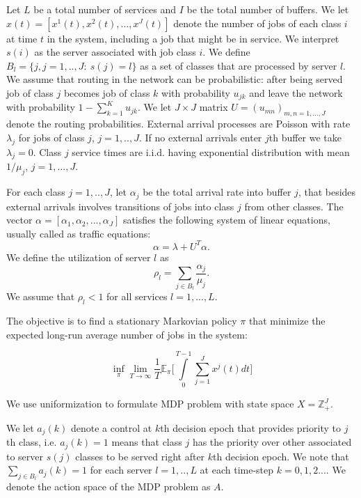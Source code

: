 \documentclass[11pt]{article}
\newcommand{\E}{\mathbb{E}}
\theoremstyle{definition}
\numberwithin{equation}{section}
\begin{document}
Let $L$ be a total number of services and $I$ be the total number of buffers.  We let $x(t) = [x^1(t), x^2(t), ..., x^J(t)]$ denote the number of jobs of each class $i$ at time $t$ in the system, including a job that might be in service. We interpret $s(i)$ as the server associated with job class $i$. We define $B_l = \{j, j=1, .., J:~ s(j)  = l\}$ as a set of classes that are processed by server $l$. We assume that routing in the network can be probabilistic: after being served  job of class $j$ becomes job of  class $k$ with probability $u_{jk}$ and leave the network with probability $1 - \sum\limits_{k=1}^K u_{jk}.$ We let $J\times J$ matrix $U = (u_{mn})_{m,n=1,..., J}$ denote the routing probabilities. External arrival processes are Poisson with rate $\lambda_j$ for jobs of class $j$, $j=1, .., J$. If no  external arrivals enter $j$th buffer we take $\lambda_j=0$. Class $j$ service times are i.i.d. having exponential
distribution with mean $1/\mu_j$, $j=1, ..., J$.


For each class $j = 1, .., J$, let $\alpha_j$ be the total arrival rate
into buffer $j$, that besides external arrivals involves transitions of jobs into class $j$ from
other classes. The vector $\alpha = [\alpha_1, \alpha_2, ..., \alpha_J]$ satisfies the following system of linear
equations, usually called as traffic equations: \begin{equation}\alpha = \lambda +U^T\alpha.\end{equation} We define the utilization of server $l$ as \begin{equation}\rho_l = \sum\limits_{j\in B_l} \frac{\alpha_j}{\mu_j}.\end{equation}
We assume that $\rho_l<1$ for all  services $l = 1, ..., L$.

 The objective is to find a stationary Markovian policy  $\pi$ that   minimize the expected long-run average number of jobs in the system:

\begin{equation}
 \inf\limits_\pi \lim\limits_{T\rightarrow \infty} \frac{1}{T} \E_{\pi}\Big[\int\limits_{0}^{T-1}\sum\limits_{j=1}^J x^j(t)dt\Big]
\end{equation}


We use uniformization to formulate MDP problem with state space $X = \mathbb{Z}_+^J$.

We let $a_j(k)$  denote a control at $k$th decision epoch that provides priority to $j$th class, i.e. $a_j(k)=1$ means that class $j$ has the priority over other associated to server $s(j)$ classes to be served right after $k$th decision epoch. We note that $\sum\limits_{j \in B_l} a_j(k)=1$ for each server $l=1, .., L$ at each time-step $k=0, 1, 2....$  We denote the action space of the MDP problem as $A$.
\end{document}
